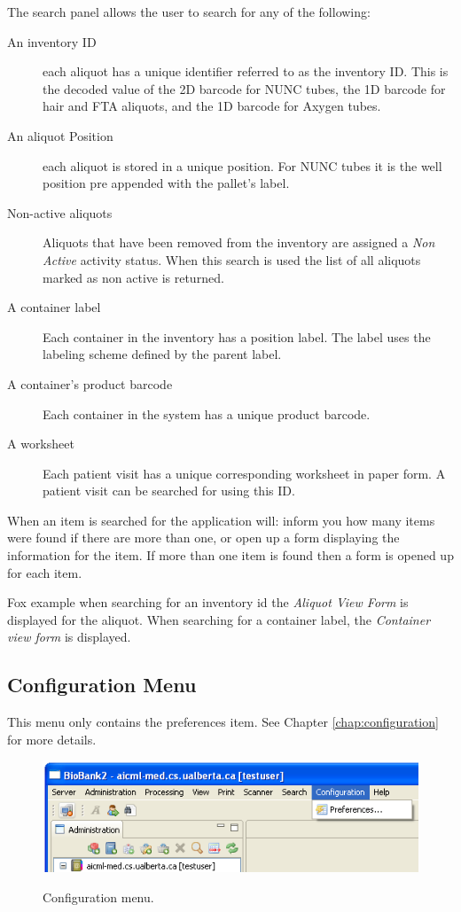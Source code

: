 The search panel allows the user to search for any of the following:
\begin{description}
\item[An inventory ID] each aliquot has a unique identifier referred to as
  the inventory ID. This is the decoded value of the 2D barcode for NUNC
  tubes, the 1D barcode for hair and FTA aliquots, and the 1D barcode for
  Axygen tubes.
\item[An aliquot Position] each aliquot is stored in a unique position. For
  NUNC tubes it is the well position pre appended with the pallet's label.
\item[Non-active aliquots] Aliquots that have been removed from the inventory
  are assigned a \emph{Non Active} activity status. When this search is used
  the list of all aliquots marked as non active is returned.
\item[A container label] Each container in the inventory has a position
  label. The label uses the labeling scheme defined by the parent label.
\item[A container's product barcode] Each container in the system has a
  unique product barcode.
\item[A worksheet] Each patient visit has a unique corresponding worksheet in
  paper form. A patient visit can be searched for using this ID.
\end{description}
When an item is searched for the application will: inform you how many items
were found if there are more than one, or open up a form displaying the
information for the item. If more than one item is found then a form is opened
up for each item.

Fox example when searching for an inventory id the \emph{Aliquot View Form} is
displayed for the aliquot. When searching for a container label, the
\emph{Container view form} is displayed.

\subsection{Configuration Menu}
This menu only contains the preferences item. See Chapter
\ref{chap:configuration} for more details.
\begin{figure}[H]
  \centering
  \scalebox{0.5}
	   { \includegraphics*{screenshots/overview/main_menu_configuration} }
	   \caption{Configuration menu.}
	   \label{fig:main_menu_configuration}
\end{figure}

